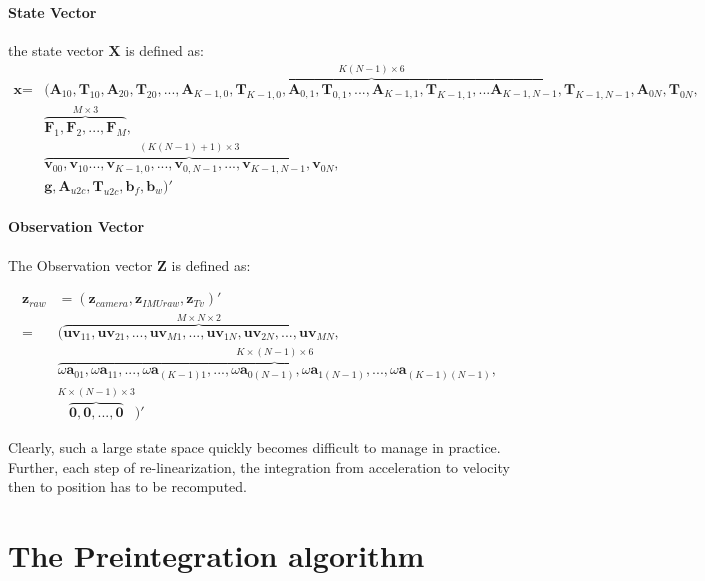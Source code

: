 \documentclass[12pt]{article}   %
\begin{document}
\paragraph{State Vector}
the state vector $\textbf{X}$ is defined as:
\begin{align*}
\textbf{x} = &(\overbrace{\textbf{A}_{10}, \textbf{T}_{10}, \textbf{A}_{20}, \textbf{T}_{20},... ,\textbf{A}_{K-1,0}, \textbf{T}_{K-1,0},\textbf{A}_{0,1}, \textbf{T}_{0,1},...,\textbf{A}_{K-1,1}, \textbf{T}_{K-1,1},... \textbf{A}_{K-1,N-1}, \textbf{T}_{K-1,N-1},\textbf{A}_{0N}, \textbf{T}_{0N}}^{K(N - 1) \times 6},\\
	 &\overbrace{\textbf{F}_{1},\textbf{F}_{2}, ..., \textbf{F}_{M}}^{M \times 3},\\
	 &\overbrace{\textbf{v}_{00},\textbf{v}_{10} ...,\textbf{v}_{K-1,0}, ...,\textbf{v}_{0,N-1},...,\textbf{v}_{K-1,N-1}, \textbf{v}_{0N}}^{(K(N-1)+1) \times 3},\\
	 &\textbf{g}, \textbf{A}_{u2c}, \textbf{T}_{u2c}, \textbf{b}_f, \textbf{b}_w )' 
\end{align*}

\paragraph{Observation Vector}
The Observation vector $\textbf{Z}$ is defined as:

\begin{align}
\textbf{z}_{raw} &= (\textbf{z}_{camera}, \textbf{z}_{IMUraw}, \textbf{z}_{Tv})' \nonumber \\
=& (\overbrace{\textbf{uv}_{11}, \textbf{uv}_{21}, ... , \textbf{uv}_{M1}, ..., \textbf{uv}_{1N}, \textbf{uv}_{2N}, ... , \textbf{uv}_{MN}}^{M \times N \times 2}, \nonumber \\ 
& \overbrace{\omega\textbf{a}_{01}, \omega\textbf{a}_{11}, ... , \omega\textbf{a}_{(K-1)1}, ..., \omega\textbf{a}_{0(N-1)}, \omega\textbf{a}_{1(N-1)}, ... , \omega\textbf{a}_{(K-1)(N-1)}}^{K \times (N-1) \times 6}, \\
& \overbrace{\textbf{0}, \textbf{0}, ... , \textbf{0}}^{K \times (N-1) \times 3})' 
\end{align}

Clearly, such a large state space quickly becomes difficult to manage in practice. Further, each step of re-linearization, the integration from acceleration to velocity then to position has to be recomputed.

\section{The Preintegration algorithm}
\end{document}

